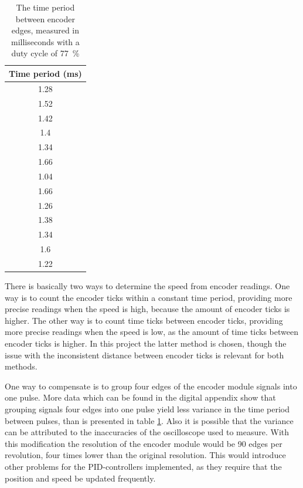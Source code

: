 \documentclass[../../main.tex]{subfiles}
\begin{document}
\begin{table}
    \centering
    \begin{tabular}{c}
         Time period (ms) \\
         \hline
         1.28 \\
         1.52 \\
         1.42 \\
         1.4 \\
         1.34 \\
         1.66 \\
         1.04 \\
         1.66 \\
         1.26 \\
         1.38 \\
         1.34 \\
         1.6 \\
         1.22 \\
         \hline
    \end{tabular}
    \caption{The time period between encoder edges, measured in milliseconds with a duty cycle of \SI{77}{\percent} }
    \label{tab:EncoderDifferenceBetweenEdges}
\end{table}

There is basically two ways to determine the speed from encoder readings. One way is to count the encoder ticks within
a constant time period, providing more precise readings when the speed is high, because the amount of encoder ticks is higher. The other way is to count time ticks between encoder ticks, providing more precise readings when the speed is low, as the amount of time ticks between encoder ticks is higher. In this project the latter method is chosen, though the issue with the inconsistent distance between encoder ticks is relevant for both methods.      

One way to compensate is to group four edges of the encoder module signals into one pulse. More data which can be found in the digital appendix show that grouping signals four edges into one pulse yield less variance in the time period between pulses, than is presented in table \ref{tab:EncoderDifferenceBetweenEdges}. Also it is possible that the variance can be attributed to the inaccuracies of the oscilloscope used to measure. With this modification the resolution of the encoder module would be 90 edges per revolution, four times lower than the original resolution. This would introduce other problems for the PID-controllers implemented, as they require that the position and speed be updated frequently. 
\end{document}
